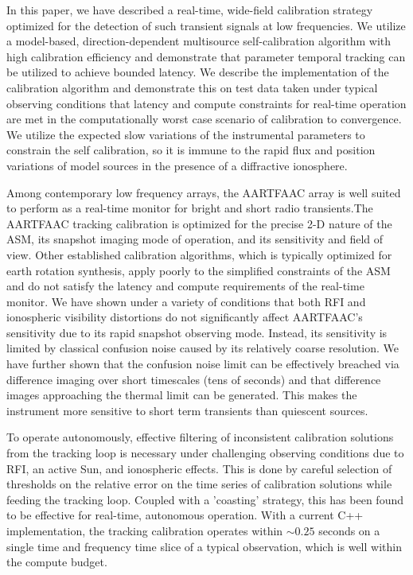 \documentclass[referee]{aa}
\begin{document}
In this  paper, we have  described a real-time, wide-field  calibration strategy
optimized for  the detection of such  transient signals at  low frequencies.  We
utilize   a   model-based,   direction-dependent  multisource   self-calibration
algorithm  with  high  calibration  efficiency and  demonstrate  that  parameter
temporal tracking can  be utilized to achieve bounded  latency.  We describe the
implementation of  the calibration algorithm  and demonstrate this on  test data
taken under  typical observing conditions  that latency and  compute constraints
for real-time  operation are met in  the computationally worst  case scenario of
calibration  to convergence.   We utilize  the expected  slow variations  of the
instrumental parameters  to constrain the self  calibration, so it  is immune to
the rapid  flux and position  variations of model  sources in the presence  of a
diffractive ionosphere.

Among  contemporary low  frequency  arrays, the  \mbox{AARTFAAC}  array is  well
suited  to  perform   as  a  real-time  monitor  for   bright  and  short  radio
transients.The \mbox{AARTFAAC} tracking calibration is optimized for the precise
2-D  nature  of  the ASM,  its  snapshot  imaging  mode  of operation,  and  its
sensitivity and field of  view.  Other established calibration algorithms, which
is  typically  optimized for  earth  rotation  synthesis,  apply poorly  to  the
simplified constraints  of the ASM  and do not  satisfy the latency  and compute
requirements  of  the real-time  monitor.   We have  shown  under  a variety  of
conditions  that  both  RFI   and  ionospheric  visibility  distortions  do  not
significantly  affect \mbox{AARTFAAC's}  sensitivity due  to its  rapid snapshot
observing  mode.  Instead,  its sensitivity  is limited  by  classical confusion
noise caused  by its relatively coarse  resolution.  We have  further shown that
the confusion  noise limit  can be effectively  breached via  difference imaging
over short timescales (tens of  seconds) and that difference images approaching
the thermal limit can be generated.  This makes the instrument more sensitive to
short term transients than quiescent sources.

To  operate  autonomously,   effective  filtering  of  inconsistent  calibration
solutions  from  the tracking  loop  is  necessary  under challenging  observing
conditions due to  RFI, an active Sun, and ionospheric effects.   This is done by
careful  selection of  thresholds on  the relative  error on  the  time series of
calibration solutions while feeding the tracking loop. Coupled with a 'coasting'
strategy,  this  has  been  found  to be  effective  for  real-time,  autonomous
operation. With a current  C++ implementation, the tracking calibration operates
within $\sim$$0.25$ seconds on a single time and frequency time slice of a typical
observation, which is well within the compute budget.
\end{document}
